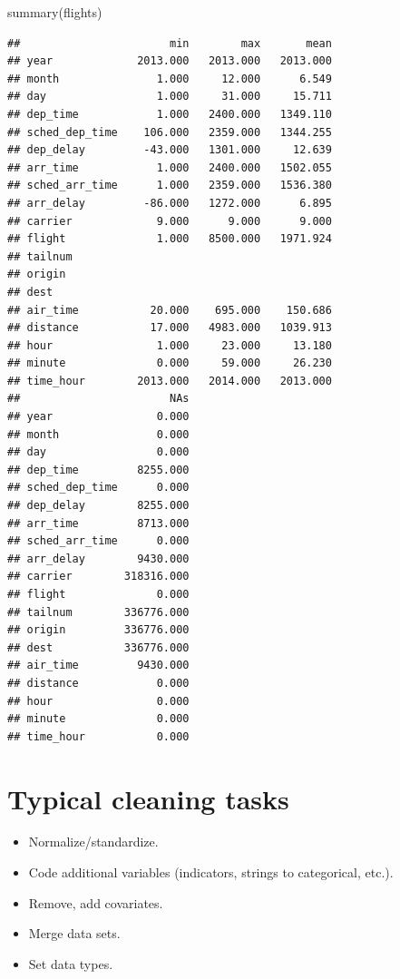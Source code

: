 \documentclass[
  12pt,
]{style/krantz}
\newenvironment{Shaded}{\begin{snugshade}}{\end{snugshade}}
\newcommand{\FunctionTok}[1]{\textcolor[rgb]{0.00,0.00,0.00}{#1}}
\newcommand{\NormalTok}[1]{#1}
\providecommand{\tightlist}{%
  \setlength{\itemsep}{0pt}\setlength{\parskip}{0pt}}
\begin{document}
\begin{Shaded}
\begin{Highlighting}[]
\FunctionTok{summary}\NormalTok{(flights)}
\end{Highlighting}
\end{Shaded}

\begin{verbatim}
##                       min        max       mean
## year             2013.000   2013.000   2013.000
## month               1.000     12.000      6.549
## day                 1.000     31.000     15.711
## dep_time            1.000   2400.000   1349.110
## sched_dep_time    106.000   2359.000   1344.255
## dep_delay         -43.000   1301.000     12.639
## arr_time            1.000   2400.000   1502.055
## sched_arr_time      1.000   2359.000   1536.380
## arr_delay         -86.000   1272.000      6.895
## carrier             9.000      9.000      9.000
## flight              1.000   8500.000   1971.924
## tailnum                                        
## origin                                         
## dest                                           
## air_time           20.000    695.000    150.686
## distance           17.000   4983.000   1039.913
## hour                1.000     23.000     13.180
## minute              0.000     59.000     26.230
## time_hour        2013.000   2014.000   2013.000
##                       NAs
## year                0.000
## month               0.000
## day                 0.000
## dep_time         8255.000
## sched_dep_time      0.000
## dep_delay        8255.000
## arr_time         8713.000
## sched_arr_time      0.000
## arr_delay        9430.000
## carrier        318316.000
## flight              0.000
## tailnum        336776.000
## origin         336776.000
## dest           336776.000
## air_time         9430.000
## distance            0.000
## hour                0.000
## minute              0.000
## time_hour           0.000
\end{verbatim}

\hypertarget{typical-cleaning-tasks}{%
\section{Typical cleaning tasks}\label{typical-cleaning-tasks}}

\begin{itemize}
\tightlist
\item
  Normalize/standardize.
\item
  Code additional variables (indicators, strings to categorical, etc.).
\item
  Remove, add covariates.
\item
  Merge data sets.
\item
  Set data types.
\end{itemize}
\end{document}
